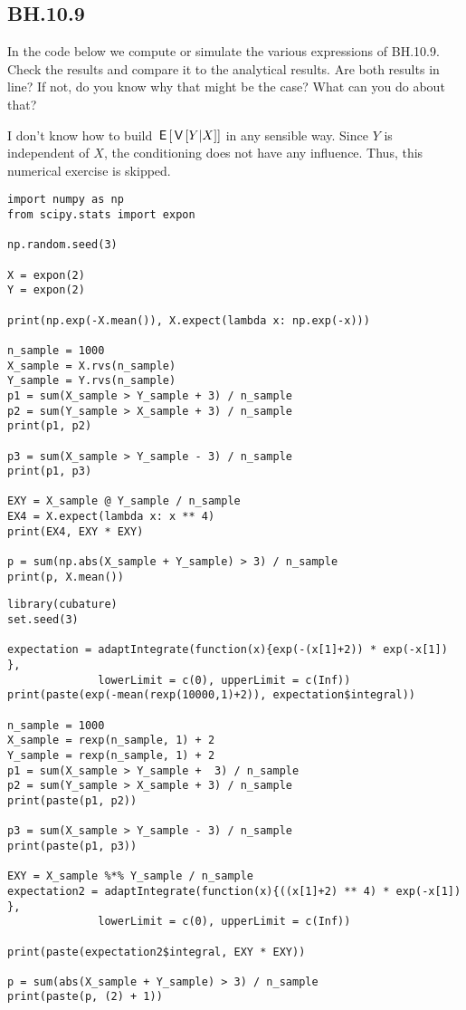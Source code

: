 

\subsection{BH.10.9}


\begin{exercise}
In the code below we compute or simulate the various expressions of BH.10.9. Check the results and compare it to the analytical results. Are both results in line? If not, do you know why that might be the case? What can you do about that?

I don't know how to build $\,\mathsf{E}\left[\,\mathsf{V}\left[Y|X\right]\right]$ in any sensible way. Since $Y$ is independent of $X$, the conditioning does not have any influence. Thus, this numerical exercise is skipped.
\end{exercise}

\begin{verbatim}
import numpy as np
from scipy.stats import expon

np.random.seed(3)

X = expon(2)
Y = expon(2)

print(np.exp(-X.mean()), X.expect(lambda x: np.exp(-x)))

n_sample = 1000
X_sample = X.rvs(n_sample)
Y_sample = Y.rvs(n_sample)
p1 = sum(X_sample > Y_sample + 3) / n_sample
p2 = sum(Y_sample > X_sample + 3) / n_sample
print(p1, p2)

p3 = sum(X_sample > Y_sample - 3) / n_sample
print(p1, p3)

EXY = X_sample @ Y_sample / n_sample
EX4 = X.expect(lambda x: x ** 4)
print(EX4, EXY * EXY)

p = sum(np.abs(X_sample + Y_sample) > 3) / n_sample
print(p, X.mean())
\end{verbatim}

\begin{verbatim}
library(cubature)   
set.seed(3)

expectation = adaptIntegrate(function(x){exp(-(x[1]+2)) * exp(-x[1]) },
              lowerLimit = c(0), upperLimit = c(Inf))
print(paste(exp(-mean(rexp(10000,1)+2)), expectation$integral))

n_sample = 1000
X_sample = rexp(n_sample, 1) + 2
Y_sample = rexp(n_sample, 1) + 2
p1 = sum(X_sample > Y_sample +  3) / n_sample
p2 = sum(Y_sample > X_sample + 3) / n_sample
print(paste(p1, p2))

p3 = sum(X_sample > Y_sample - 3) / n_sample
print(paste(p1, p3))

EXY = X_sample %*% Y_sample / n_sample
expectation2 = adaptIntegrate(function(x){((x[1]+2) ** 4) * exp(-x[1]) }, 
              lowerLimit = c(0), upperLimit = c(Inf))

print(paste(expectation2$integral, EXY * EXY))

p = sum(abs(X_sample + Y_sample) > 3) / n_sample
print(paste(p, (2) + 1))
\end{verbatim}



